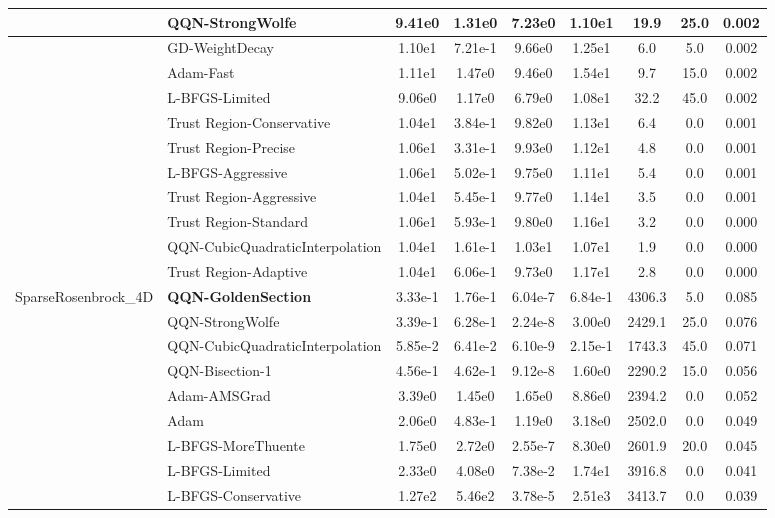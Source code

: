 \documentclass[10pt]{article}
\begin{document}
\begin{longtable}{|l|l|c|c|c|c|c|c|c|}
\hline
 & QQN-StrongWolfe & 9.41e0 & 1.31e0 & 7.23e0 & 1.10e1 & 19.9 & 25.0 & 0.002 \\
\hline
 & GD-WeightDecay & 1.10e1 & 7.21e-1 & 9.66e0 & 1.25e1 & 6.0 & 5.0 & 0.002 \\
\hline
 & Adam-Fast & 1.11e1 & 1.47e0 & 9.46e0 & 1.54e1 & 9.7 & 15.0 & 0.002 \\
\hline
 & L-BFGS-Limited & 9.06e0 & 1.17e0 & 6.79e0 & 1.08e1 & 32.2 & 45.0 & 0.002 \\
\hline
 & Trust Region-Conservative & 1.04e1 & 3.84e-1 & 9.82e0 & 1.13e1 & 6.4 & 0.0 & 0.001 \\
\hline
 & Trust Region-Precise & 1.06e1 & 3.31e-1 & 9.93e0 & 1.12e1 & 4.8 & 0.0 & 0.001 \\
\hline
 & L-BFGS-Aggressive & 1.06e1 & 5.02e-1 & 9.75e0 & 1.11e1 & 5.4 & 0.0 & 0.001 \\
\hline
 & Trust Region-Aggressive & 1.04e1 & 5.45e-1 & 9.77e0 & 1.14e1 & 3.5 & 0.0 & 0.001 \\
\hline
 & Trust Region-Standard & 1.06e1 & 5.93e-1 & 9.80e0 & 1.16e1 & 3.2 & 0.0 & 0.000 \\
\hline
 & QQN-CubicQuadraticInterpolation & 1.04e1 & 1.61e-1 & 1.03e1 & 1.07e1 & 1.9 & 0.0 & 0.000 \\
\hline
 & Trust Region-Adaptive & 1.04e1 & 6.06e-1 & 9.73e0 & 1.17e1 & 2.8 & 0.0 & 0.000 \\
SparseRosenbrock\_4D & \textbf{QQN-GoldenSection} & 3.33e-1 & 1.76e-1 & 6.04e-7 & 6.84e-1 & 4306.3 & 5.0 & 0.085 \\
\hline
 & QQN-StrongWolfe & 3.39e-1 & 6.28e-1 & 2.24e-8 & 3.00e0 & 2429.1 & 25.0 & 0.076 \\
\hline
 & QQN-CubicQuadraticInterpolation & 5.85e-2 & 6.41e-2 & 6.10e-9 & 2.15e-1 & 1743.3 & 45.0 & 0.071 \\
\hline
 & QQN-Bisection-1 & 4.56e-1 & 4.62e-1 & 9.12e-8 & 1.60e0 & 2290.2 & 15.0 & 0.056 \\
\hline
 & Adam-AMSGrad & 3.39e0 & 1.45e0 & 1.65e0 & 8.86e0 & 2394.2 & 0.0 & 0.052 \\
\hline
 & Adam & 2.06e0 & 4.83e-1 & 1.19e0 & 3.18e0 & 2502.0 & 0.0 & 0.049 \\
\hline
 & L-BFGS-MoreThuente & 1.75e0 & 2.72e0 & 2.55e-7 & 8.30e0 & 2601.9 & 20.0 & 0.045 \\
\hline
 & L-BFGS-Limited & 2.33e0 & 4.08e0 & 7.38e-2 & 1.74e1 & 3916.8 & 0.0 & 0.041 \\
\hline
 & L-BFGS-Conservative & 1.27e2 & 5.46e2 & 3.78e-5 & 2.51e3 & 3413.7 & 0.0 & 0.039 \\

\end{longtable}
\end{document}
